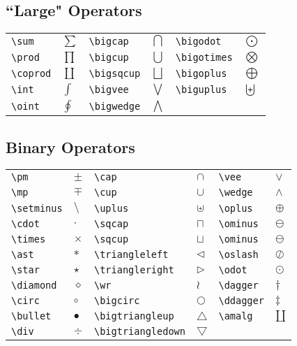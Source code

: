 \subsection{``Large" Operators}
\begin{table}[!htbp]
    \centering
    \begin{tabular}{lp{2cm}lp{2cm}lp{2cm}}
	\verb|\sum|	    & $\sum$	&
	\verb|\bigcap|	    & $\bigcap$	&
	\verb|\bigodot|	    & $\bigodot$	\\
	\verb|\prod|	    & $\prod$	&
	\verb|\bigcup|	    & $\bigcup$	&
	\verb|\bigotimes|   & $\bigotimes$	\\
	\verb|\coprod|	    & $\coprod$	&
	\verb|\bigsqcup|    & $\bigsqcup$	&
	\verb|\bigoplus|    & $\bigoplus$	\\
	\verb|\int|	    & $\int$	&
	\verb|\bigvee|	    & $\bigvee$	&
	\verb|\biguplus|    & $\biguplus$	\\
	\verb|\oint|	    & $\oint$	&
	\verb|\bigwedge|    & $\bigwedge$	&
	&   \\
    \end{tabular}
\end{table}


\subsection{Binary Operators}
\begin{table}[H]
    \centering
    \begin{tabular}{lp{2cm}lp{2cm}lp{2cm}}
	\verb|\pm|	    & $\pm$	&
	\verb|\cap|	    & $\cap$	&
	\verb|\vee|	    & $\vee$	\\
	\verb|\mp|	    & $\mp$	&
	\verb|\cup|	    & $\cup$	&
	\verb|\wedge|	    & $\wedge$	\\
	\verb|\setminus|    & $\setminus$	&
	\verb|\uplus|	    & $\uplus$	&
	\verb|\oplus|	    & $\oplus$	\\
	\verb|\cdot|	    & $\cdot$	&
	\verb|\sqcap|	    & $\sqcap$	&
	\verb|\ominus|	    & $\ominus$	\\
	\verb|\times|	    & $\times$	&
	\verb|\sqcup|	    & $\sqcup$	&
	\verb|\ominus|	    & $\ominus$	\\
	\verb|\ast|	    & $\ast$	&
	\verb|\triangleleft|	    & $\triangleleft$	&
	\verb|\oslash|	    & $\oslash$	\\
	\verb|\star|	    & $\star$	&
	\verb|\triangleright|	    & $\triangleright$	&
	\verb|\odot|	    & $\odot$	\\
	\verb|\diamond|	    & $\diamond$	&
	\verb|\wr|	    & $\wr$	&
	\verb|\dagger|	    & $\dagger$	\\
	\verb|\circ|	    & $\circ$	&
	\verb|\bigcirc|	    & $\bigcirc$	&
	\verb|\ddagger|	    & $\ddagger$	\\
	\verb|\bullet|	    & $\bullet$	&
	\verb|\bigtriangleup|	    & $\bigtriangleup$	&
	\verb|\amalg|	    & $\amalg$	\\
	\verb|\div|	    & $\div$	&
	\verb|\bigtriangledown|	    & $\bigtriangledown$	&
	&   \\
    \end{tabular}
\end{table}
